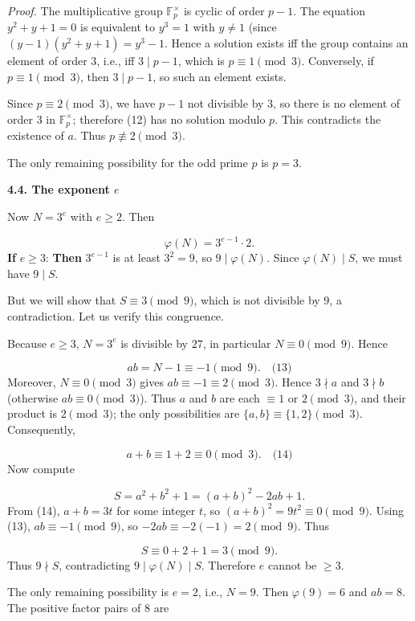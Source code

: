 \documentclass{llmxive}
\providecommand{\solutionheading}[1]{\par\smallskip\noindent\textbf{#1}\par}
\begin{document}
\emph{Proof.} The multiplicative group \(\mathbb{F}_p^{\times}\) is cyclic of order \(p-1\). The equation \(y^{2}+y+1=0\) is equivalent to \(y^{3}=1\) with \(y \neq 1\) (since \((y-1)(y^{2}+y+1)=y^{3}-1\). Hence a solution exists iff the group contains an element of order \(3\), i.e., iff \(3 \mid p-1\), which is \(p \equiv 1 \pmod{3}\). Conversely, if \(p \equiv 1 \pmod{3}\), then \(3 \mid p-1\), so such an element exists.\par
Since \(p \equiv 2 \pmod{3}\), we have \(p-1\) not divisible by \(3\), so there is no element of order \(3\) in \(\mathbb{F}_p^{\times}\); therefore (12) has no solution modulo \(p\). This contradicts the existence of \(a\). Thus \(p \not\equiv 2 \pmod{3}\).\par
The only remaining possibility for the odd prime \(p\) is \(p = 3\).\par
\solutionheading{4.4. The exponent \(e\)}
Now \(N = 3^{e}\) with \(e \ge 2\). Then\par
\[
\varphi(N) = 3^{e-1} \cdot 2.
\]
\textbf{If }\(e \ge 3\):\textbf{ Then }\(3^{e-1}\) is at least \(3^{2}=9\), so \(9 \mid \varphi(N)\). Since \(\varphi(N) \mid S\), we must have \(9 \mid S\).\par
But we will show that \(S \equiv 3 \pmod{9}\), which is not divisible by \(9\), a contradiction. Let us verify this congruence.\par
Because \(e \ge 3\), \(N = 3^{e}\) is divisible by \(27\), in particular \(N \equiv 0 \pmod{9}\). Hence\par
\[
ab = N-1 \equiv -1 \pmod{9}. \quad\text{(13)}
\]
Moreover, \(N \equiv 0 \pmod{3}\) gives \(ab \equiv -1 \equiv 2 \pmod{3}\). Hence \(3 \nmid a\) and \(3 \nmid b\) (otherwise \(ab \equiv 0 \pmod{3}\)). Thus \(a\) and \(b\) are each \(\equiv 1\) or \(2 \pmod{3}\), and their product is \(2 \pmod{3}\); the only possibilities are \(\{a,b\} \equiv \{1,2\} \pmod{3}\). Consequently,\par
\[
a + b \equiv 1 + 2 \equiv 0 \pmod{3}. \quad\text{(14)}
\]
Now compute\par
\[
S = a^{2}+b^{2}+1 = (a+b)^{2} - 2ab + 1.
\]
From (14), \(a+b = 3t\) for some integer \(t\), so \((a+b)^{2} = 9t^{2} \equiv 0 \pmod{9}\). Using (13), \(ab \equiv -1 \pmod{9}\), so \(-2ab \equiv -2(-1) = 2 \pmod{9}\). Thus\par
\[
S \equiv 0 + 2 + 1 = 3 \pmod{9}.
\]
Thus \(9 \nmid S\), contradicting \(9 \mid \varphi(N) \mid S\). Therefore \(e\) cannot be \(\ge 3\).\par
The only remaining possibility is \(e = 2\), i.e., \(N = 9\). Then \(\varphi(9) = 6\) and \(ab = 8\). The positive factor pairs of \(8\) are\par
\end{document}
